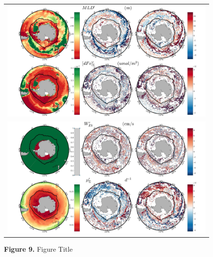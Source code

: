 \begin{figure}[!htbp]
 \centering
 \begin{adjustwidth}{-1in}{0in}
  \begin{tabular}{c }
        \includegraphics[scale=.6]{Fig9/Not_Smoothed/Fig9a_w.pdf} \\
        \includegraphics[scale=.6]{Fig9/Not_Smoothed/Fig9b_w.pdf} \\
    
  \end{tabular}
 \end{adjustwidth}
\caption[Figure Title]
{\textbf{Figure 9.} Figure Title
}
\label{fig:Fig9}
\end{figure}


